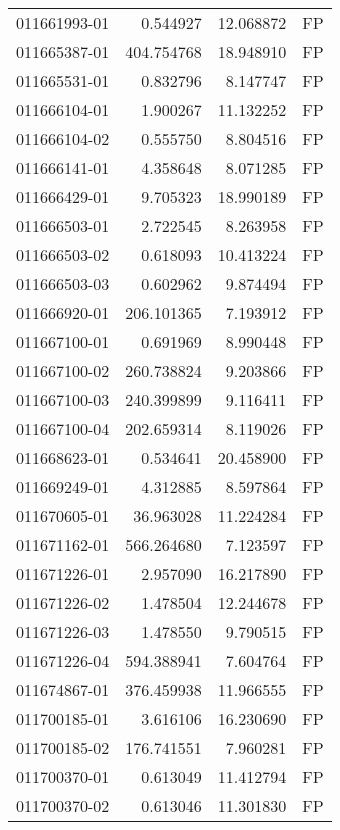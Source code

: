 \begin{tabular}{lrrl}
011661993-01 &    0.544927 &      12.068872 &   FP \\
011665387-01 &  404.754768 &      18.948910 &   FP \\
011665531-01 &    0.832796 &       8.147747 &   FP \\
011666104-01 &    1.900267 &      11.132252 &   FP \\
011666104-02 &    0.555750 &       8.804516 &   FP \\
011666141-01 &    4.358648 &       8.071285 &   FP \\
011666429-01 &    9.705323 &      18.990189 &   FP \\
011666503-01 &    2.722545 &       8.263958 &   FP \\
011666503-02 &    0.618093 &      10.413224 &   FP \\
011666503-03 &    0.602962 &       9.874494 &   FP \\
011666920-01 &  206.101365 &       7.193912 &   FP \\
011667100-01 &    0.691969 &       8.990448 &   FP \\
011667100-02 &  260.738824 &       9.203866 &   FP \\
011667100-03 &  240.399899 &       9.116411 &   FP \\
011667100-04 &  202.659314 &       8.119026 &   FP \\
011668623-01 &    0.534641 &      20.458900 &   FP \\
011669249-01 &    4.312885 &       8.597864 &   FP \\
011670605-01 &   36.963028 &      11.224284 &   FP \\
011671162-01 &  566.264680 &       7.123597 &   FP \\
011671226-01 &    2.957090 &      16.217890 &   FP \\
011671226-02 &    1.478504 &      12.244678 &   FP \\
011671226-03 &    1.478550 &       9.790515 &   FP \\
011671226-04 &  594.388941 &       7.604764 &   FP \\
011674867-01 &  376.459938 &      11.966555 &   FP \\
011700185-01 &    3.616106 &      16.230690 &   FP \\
011700185-02 &  176.741551 &       7.960281 &   FP \\
011700370-01 &    0.613049 &      11.412794 &   FP \\
011700370-02 &    0.613046 &      11.301830 &   FP \\

\end{tabular}
